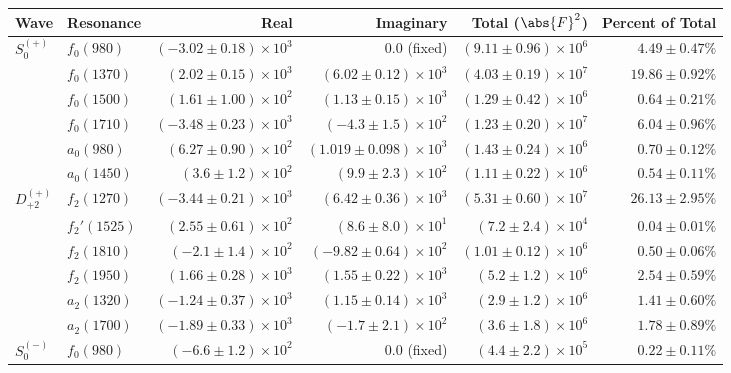 \begin{table}[ht]
    \begin{center}
        \begin{tabular}{llrrrr}\toprule
        Wave & Resonance & Real & Imaginary & Total ($\abs{F}^2$) & Percent of Total \\\midrule
$S_{0}^{(+)}$ & $f_{0}(980)$ & $(-3.02 \pm 0.18) \times 10^{3}$ & $0.0$ (fixed) & $(9.11 \pm 0.96) \times 10^{6}$ & $4.49 \pm 0.47 \%$ \\
 & $f_{0}(1370)$ & $(2.02 \pm 0.15) \times 10^{3}$ & $(6.02 \pm 0.12) \times 10^{3}$ & $(4.03 \pm 0.19) \times 10^{7}$ & $19.86 \pm 0.92 \%$ \\
 & $f_{0}(1500)$ & $(1.61 \pm 1.00) \times 10^{2}$ & $(1.13 \pm 0.15) \times 10^{3}$ & $(1.29 \pm 0.42) \times 10^{6}$ & $0.64 \pm 0.21 \%$ \\
 & $f_{0}(1710)$ & $(-3.48 \pm 0.23) \times 10^{3}$ & $(-4.3 \pm 1.5) \times 10^{2}$ & $(1.23 \pm 0.20) \times 10^{7}$ & $6.04 \pm 0.96 \%$ \\
 & $a_{0}(980)$ & $(6.27 \pm 0.90) \times 10^{2}$ & $(1.019 \pm 0.098) \times 10^{3}$ & $(1.43 \pm 0.24) \times 10^{6}$ & $0.70 \pm 0.12 \%$ \\
 & $a_{0}(1450)$ & $(3.6 \pm 1.2) \times 10^{2}$ & $(9.9 \pm 2.3) \times 10^{2}$ & $(1.11 \pm 0.22) \times 10^{6}$ & $0.54 \pm 0.11 \%$ \\
$D_{+2}^{(+)}$ & $f_{2}(1270)$ & $(-3.44 \pm 0.21) \times 10^{3}$ & $(6.42 \pm 0.36) \times 10^{3}$ & $(5.31 \pm 0.60) \times 10^{7}$ & $26.13 \pm 2.95 \%$ \\
 & $f_{2}'(1525)$ & $(2.55 \pm 0.61) \times 10^{2}$ & $(8.6 \pm 8.0) \times 10^{1}$ & $(7.2 \pm 2.4) \times 10^{4}$ & $0.04 \pm 0.01 \%$ \\
 & $f_{2}(1810)$ & $(-2.1 \pm 1.4) \times 10^{2}$ & $(-9.82 \pm 0.64) \times 10^{2}$ & $(1.01 \pm 0.12) \times 10^{6}$ & $0.50 \pm 0.06 \%$ \\
 & $f_{2}(1950)$ & $(1.66 \pm 0.28) \times 10^{3}$ & $(1.55 \pm 0.22) \times 10^{3}$ & $(5.2 \pm 1.2) \times 10^{6}$ & $2.54 \pm 0.59 \%$ \\
 & $a_{2}(1320)$ & $(-1.24 \pm 0.37) \times 10^{3}$ & $(1.15 \pm 0.14) \times 10^{3}$ & $(2.9 \pm 1.2) \times 10^{6}$ & $1.41 \pm 0.60 \%$ \\
 & $a_{2}(1700)$ & $(-1.89 \pm 0.33) \times 10^{3}$ & $(-1.7 \pm 2.1) \times 10^{2}$ & $(3.6 \pm 1.8) \times 10^{6}$ & $1.78 \pm 0.89 \%$ \\
$S_{0}^{(-)}$ & $f_{0}(980)$ & $(-6.6 \pm 1.2) \times 10^{2}$ & $0.0$ (fixed) & $(4.4 \pm 2.2) \times 10^{5}$ & $0.22 \pm 0.11 \%$ \\

\end{tabular}
\end{center}
\end{table}
